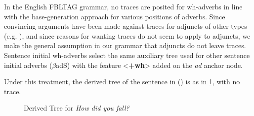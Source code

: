 
In the English FBLTAG grammar, no traces are posited for wh-adverbs in
line with the base-generation approach \cite{Ernst84} for various
positions of adverbs. Since convincing arguments have been made
against traces for adjuncts of other types (e.g. \cite{Baltin}), and
since reasons for wanting traces do not seem to apply to adjuncts, we
make the general assumption in our grammar that adjuncts do not leave
traces.  Sentence initial wh-adverbs select the same auxiliary tree
used for other sentence initial adverbs ($\beta$adS) with the feature
<{\bf +wh}> added on the {\em ad\/} anchor node.

Under this treatment, the derived tree of the sentence in () is
as in \ref{how-did-you-fall}, with no trace.



\begin{figure}[ht]
\centering
{}
\caption {Derived Tree for {\it How did you fall?}}
\label {how-did-you-fall}
\end{figure}









